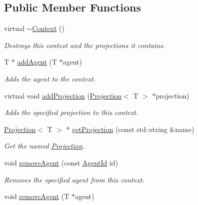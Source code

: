 \subsection*{Public Member Functions}
\begin{DoxyCompactItemize}
\item 
\hypertarget{classrepast_1_1_context_ab86028066396e40cc29cfff8d54ee581}{virtual \hyperlink{classrepast_1_1_context_ab86028066396e40cc29cfff8d54ee581}{$\sim$\-Context} ()}\label{classrepast_1_1_context_ab86028066396e40cc29cfff8d54ee581}

\begin{DoxyCompactList}\small\item\em Destroys this context and the projections it contains. \end{DoxyCompactList}\item 
T $\ast$ \hyperlink{classrepast_1_1_context_ad0bc4b142fe7154c03d4e4bd2f6836ed}{add\-Agent} (T $\ast$agent)
\begin{DoxyCompactList}\small\item\em Adds the agent to the context. \end{DoxyCompactList}\item 
virtual void \hyperlink{classrepast_1_1_context_a96d41e5246dc2940be3ea45f2a233487}{add\-Projection} (\hyperlink{classrepast_1_1_projection}{Projection}$<$ T $>$ $\ast$projection)
\begin{DoxyCompactList}\small\item\em Adds the specified projection to this context. \end{DoxyCompactList}\item 
\hyperlink{classrepast_1_1_projection}{Projection}$<$ T $>$ $\ast$ \hyperlink{classrepast_1_1_context_a10b60609163a2906e23d0b02bf76d7ac}{get\-Projection} (const std\-::string \&name)
\begin{DoxyCompactList}\small\item\em Get the named \hyperlink{classrepast_1_1_projection}{Projection}. \end{DoxyCompactList}\item 
void \hyperlink{classrepast_1_1_context_a7ef4c1e4a5f789b6402574fb2d8bd8ef}{remove\-Agent} (const \hyperlink{classrepast_1_1_agent_id}{Agent\-Id} id)
\begin{DoxyCompactList}\small\item\em Removes the specified agent from this context. \end{DoxyCompactList}\item 
\hypertarget{classrepast_1_1_context_a1ad64ba451c47e2364f33e73b482a3a4}{void \hyperlink{classrepast_1_1_context_a1ad64ba451c47e2364f33e73b482a3a4}{remove\-Agent} (T $\ast$agent)}\label{classrepast_1_1_context_a1ad64ba451c47e2364f33e73b482a3a4}


\end{DoxyCompactItemize}

